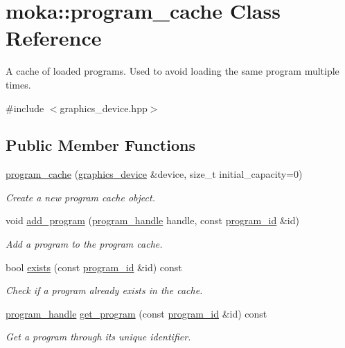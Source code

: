 \hypertarget{classmoka_1_1program__cache}{}\section{moka\+::program\+\_\+cache Class Reference}
\label{classmoka_1_1program__cache}


A cache of loaded programs. Used to avoid loading the same program multiple times.  




{\ttfamily \#include $<$graphics\+\_\+device.\+hpp$>$}

\subsection*{Public Member Functions}
\begin{DoxyCompactItemize}
\item 
\mbox{\hyperlink{classmoka_1_1program__cache_a2923d728c124b123d4d61ed0ba2860e8}{program\+\_\+cache}} (\mbox{\hyperlink{classmoka_1_1graphics__device}{graphics\+\_\+device}} \&device, size\+\_\+t initial\+\_\+capacity=0)
\begin{DoxyCompactList}\small\item\em Create a new program cache object. \end{DoxyCompactList}\item 
void \mbox{\hyperlink{classmoka_1_1program__cache_a9eeca1026c37479e73f2b9affdc160d2}{add\+\_\+program}} (\mbox{\hyperlink{structmoka_1_1program__handle}{program\+\_\+handle}} handle, const \mbox{\hyperlink{namespacemoka_a2384dba7b6a57a9ae52567eefd6e177e}{program\+\_\+id}} \&id)
\begin{DoxyCompactList}\small\item\em Add a program to the program cache. \end{DoxyCompactList}\item 
bool \mbox{\hyperlink{classmoka_1_1program__cache_a17831cdfa073034802a676811c17968f}{exists}} (const \mbox{\hyperlink{namespacemoka_a2384dba7b6a57a9ae52567eefd6e177e}{program\+\_\+id}} \&id) const
\begin{DoxyCompactList}\small\item\em Check if a program already exists in the cache. \end{DoxyCompactList}\item 
\mbox{\hyperlink{structmoka_1_1program__handle}{program\+\_\+handle}} \mbox{\hyperlink{classmoka_1_1program__cache_a82e85196efa6321f2739ceddcd76a150}{get\+\_\+program}} (const \mbox{\hyperlink{namespacemoka_a2384dba7b6a57a9ae52567eefd6e177e}{program\+\_\+id}} \&id) const
\begin{DoxyCompactList}\small\item\em Get a program through its unique identifier. \end{DoxyCompactList}\end{DoxyCompactItemize}


